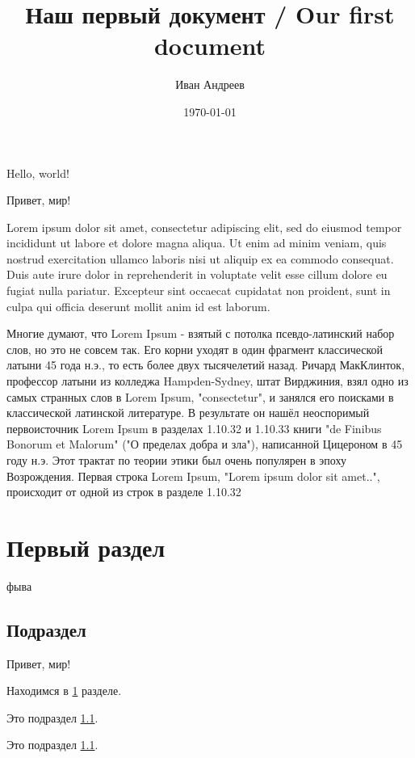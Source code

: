 \documentclass[a4paper,12pt]{article}
\author{Иван Андреев}
\title{Наш первый документ / Our first document}
\date{\today}
\begin{document}
	
\maketitle
	
Hello, world!

Привет, мир!

Lorem ipsum dolor sit amet, consectetur adipiscing elit, sed do eiusmod tempor incididunt ut labore et dolore magna aliqua. Ut enim ad minim veniam, quis nostrud exercitation ullamco laboris nisi ut aliquip ex ea commodo consequat. Duis aute irure dolor in reprehenderit in voluptate velit esse cillum dolore eu fugiat nulla pariatur. Excepteur sint occaecat cupidatat non proident, sunt in culpa qui officia deserunt mollit anim id est laborum.

Многие думают, что Lorem Ipsum - взятый с потолка псевдо-латинский набор слов, но это не совсем так. Его корни уходят в один фрагмент классической латыни 45 года н.э., то есть более двух тысячелетий назад. Ричард МакКлинток, профессор латыни из колледжа Hampden-Sydney, штат Вирджиния, взял одно из самых странных слов в Lorem Ipsum, "consectetur", и занялся его поисками в классической латинской литературе. В результате он нашёл неоспоримый первоисточник Lorem Ipsum в разделах 1.10.32 и 1.10.33 книги "de Finibus Bonorum et Malorum" ("О пределах добра и зла"), написанной Цицероном в 45 году н.э. Этот трактат по теории этики был очень популярен в эпоху Возрождения. Первая строка Lorem Ipsum, "Lorem ipsum dolor sit amet..", происходит от одной из строк в разделе 1.10.32
	
\section{Первый раздел}\label{razd}
	
фыва
	
\subsection{Подраздел}\label{podrazd}

Привет, мир!

Находимся в \ref{razd} разделе.

Это подраздел \ref{podrazd}.
	
Это подраздел \ref{podrazd}.
	
\end{document}
